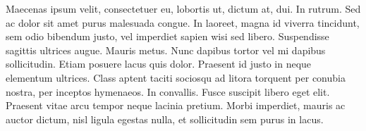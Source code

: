 Maecenas ipsum velit, consectetuer eu, lobortis ut, dictum at, dui. In rutrum. Sed ac dolor sit amet purus malesuada congue. In laoreet, magna id viverra tincidunt, sem odio bibendum justo, vel imperdiet sapien wisi sed libero. Suspendisse sagittis ultrices augue. Mauris metus. Nunc dapibus tortor vel mi dapibus sollicitudin. Etiam posuere lacus quis dolor. Praesent id justo in neque elementum ultrices. Class aptent taciti sociosqu ad litora torquent per conubia nostra, per inceptos hymenaeos. In convallis. Fusce suscipit libero eget elit. Praesent vitae arcu tempor neque lacinia pretium. Morbi imperdiet, mauris ac auctor dictum, nisl ligula egestas nulla, et sollicitudin sem purus in lacus.